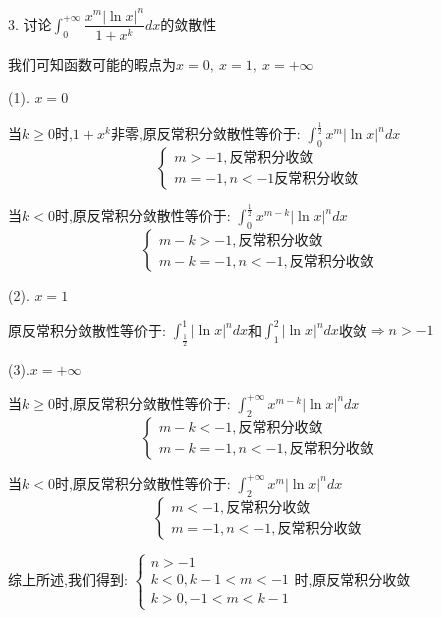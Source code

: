 3. 讨论$\int_{0}^{+\infty}\dfrac{x^m|\ln x|^n}{1+x^k}dx$的敛散性
\begin{solution}

	我们可知函数可能的暇点为$x=0,\ x=1,\ x=+\infty$
	
	(1). $x=0$
	
	当$k\geq 0$时,$1+x^{k}$非零,原反常积分敛散性等价于:  $\int_{0}^{\frac{1}{2}}x^{m}|\ln x|^ndx$
	$$\left\lbrace
	\begin{array}{l}
		m>-1,\text{反常积分收敛}\\
		m=-1,n<-1\text{反常积分收敛}
	\end{array}
	\right. $$
	
	当$k<0$时,原反常积分敛散性等价于:  $\int_{0}^{\frac{1}{2}}x^{m-k}|\ln x|^ndx$
	$$\left\lbrace
	\begin{array}{l}
		m-k>-1,\text{反常积分收敛}\\
		m-k=-1,n<-1,\text{反常积分收敛}
	\end{array}
	\right. $$
	
	(2). $x=1$
	
	原反常积分敛散性等价于:  $\int_{\frac{1}{2}}^{1}|\ln x|^ndx$和$\int_{1}^{2}|\ln x|^ndx$收敛$\Rightarrow n>-1$
	
	(3).$x=+\infty$
	
	当$k\geq 0$时,原反常积分敛散性等价于:  $\int_{2}^{+\infty}x^{m-k}|\ln x|^ndx$
	$$\left\lbrace
	\begin{array}{l}
		m-k<-1,\text{反常积分收敛}\\
		m-k=-1,n<-1,\text{反常积分收敛}
	\end{array}
	\right. $$
	
	当$k<0$时,原反常积分敛散性等价于:  $\int_{2}^{+\infty}x^{m}|\ln x|^ndx$
	$$\left\lbrace
	\begin{array}{l}
		m<-1,\text{反常积分收敛}\\
		m=-1,n<-1,\text{反常积分收敛}
	\end{array}
	\right. $$
	
	综上所述,我们得到:  $\left\lbrace
	\begin{array}{l}
		n>-1\\
		k<0,k-1<m<-1\\
		k>0,-1<m<k-1
	\end{array}
	\right. $时,原反常积分收敛
\end{solution}

